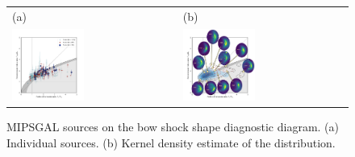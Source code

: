 \begin{figure}
  \centering
  \begin{tabular}{ll}
    (a) & (b) \\
    \includegraphics[width=0.45\textwidth]{figs/mipsgal-Rc-R90-zoom} &
    \includegraphics[width=0.45\textwidth]{figs/mipsgal-Rc-R90-thumbnails} 
  \end{tabular}
  \caption[]{MIPSGAL sources on the bow shock shape diagnostic
    diagram.  (a) Individual sources.  (b) Kernel density estimate of
    the distribution.}
  \label{fig:mipsgal-shapes}
\end{figure}


